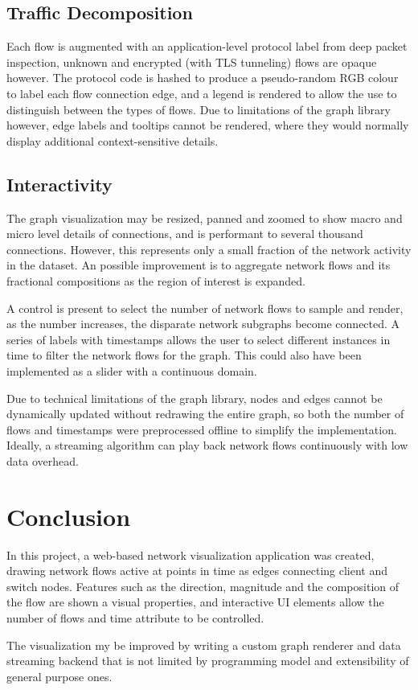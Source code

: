 \documentclass{vgtc}                          %
\begin{document}
\subsection{Traffic Decomposition}

Each flow is augmented with an application-level protocol label from deep packet inspection, unknown and encrypted (with TLS tunneling) flows are opaque however. The protocol code is hashed to produce a pseudo-random RGB colour to label each flow connection edge, and a legend is rendered to allow the use to distinguish between the types of flows. Due to limitations of the graph library however, edge labels and tooltips cannot be rendered, where they would normally display additional context-sensitive details.

\subsection{Interactivity}

The graph visualization may be resized, panned and zoomed to show macro and micro level details of connections, and is performant to several thousand connections. However, this represents only a small fraction of the network activity in the dataset. An possible improvement is to aggregate network flows and its fractional compositions as the region of interest is expanded.

A control is present to select the number of network flows to sample and render, as the number increases, the disparate network subgraphs become connected. A series of labels with timestamps allows the user to select different instances in time to filter the network flows for the graph. This could also have been implemented as a slider with a continuous domain.

Due to technical limitations of the graph library, nodes and edges cannot be dynamically updated without redrawing the entire graph, so both the number of flows and timestamps were preprocessed offline to simplify the implementation. Ideally, a streaming algorithm can play back network flows continuously with low data overhead.

\section{Conclusion}

In this project, a web-based network visualization application was created, drawing network flows active at points in time as edges connecting client and switch nodes. Features such as the direction, magnitude and the composition of the flow are shown a visual properties, and interactive UI elements allow the number of flows and time attribute to be controlled.

The visualization my be improved by writing a custom graph renderer and data streaming backend that is not limited by programming model and extensibility of general purpose ones.

%
% 
%
%
%



\end{document}
